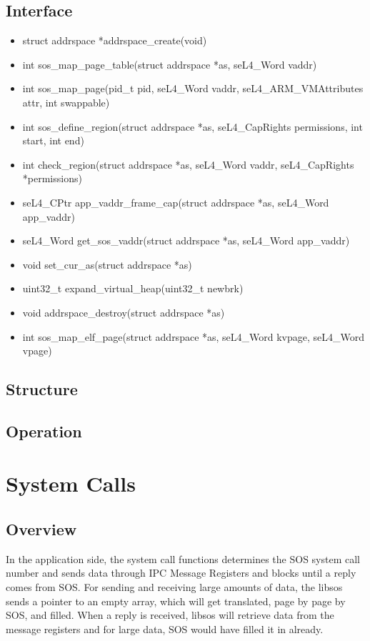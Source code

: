 \documentclass[12pt]{article}
\begin{document}
\subsection{Interface}
\begin{itemize}
\item struct addrspace *addrspace\_create(void)
\item int sos\_map\_page\_table(struct addrspace *as, seL4\_Word vaddr)
\item int sos\_map\_page(pid\_t pid, seL4\_Word vaddr, seL4\_ARM\_VMAttributes attr, int swappable)
\item int sos\_define\_region(struct addrspace *as, seL4\_CapRights permissions, int start, int end)
\item int check\_region(struct addrspace *as, seL4\_Word vaddr, seL4\_CapRights *permissions)
\item seL4\_CPtr app\_vaddr\_frame\_cap(struct addrspace *as, seL4\_Word app\_vaddr)
\item seL4\_Word get\_sos\_vaddr(struct addrspace *as, seL4\_Word app\_vaddr)
\item void set\_cur\_as(struct addrspace *as)
\item uint32\_t expand\_virtual\_heap(uint32\_t newbrk)
\item void addrspace\_destroy(struct addrspace *as)
\item int sos\_map\_elf\_page(struct addrspace *as, seL4\_Word kvpage, seL4\_Word vpage)
\end{itemize}
\subsection{Structure}
\subsection{Operation}

\clearpage
\section{System Calls}
\subsection{Overview}
In the application side, the system call functions determines the SOS system call number and sends data through IPC Message Registers and blocks until a reply comes from SOS. For sending and receiving large amounts of data, the libsos sends a pointer to an empty array, which will get translated, page by page by SOS, and filled. When a reply is received, libsos will retrieve data from the message registers and for large data, SOS would have filled it in already.
\end{document}
